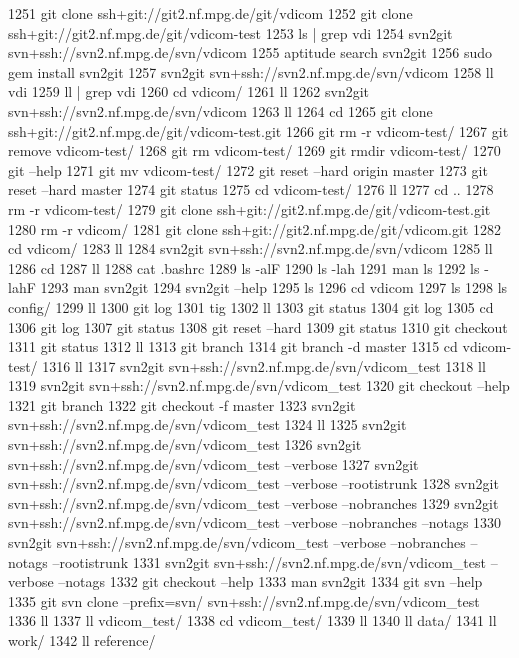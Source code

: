  1251  git clone ssh+git://git2.nf.mpg.de/git/vdicom
 1252  git clone ssh+git://git2.nf.mpg.de/git/vdicom-test
 1253  ls | grep vdi
 1254  svn2git svn+ssh://svn2.nf.mpg.de/svn/vdicom
 1255  aptitude search svn2git
 1256  sudo gem install svn2git
 1257  svn2git svn+ssh://svn2.nf.mpg.de/svn/vdicom
 1258  ll vdi
 1259  ll | grep vdi 
 1260  cd vdicom/
 1261  ll
 1262  svn2git svn+ssh://svn2.nf.mpg.de/svn/vdicom
 1263  ll
 1264  cd
 1265  git clone ssh+git://git2.nf.mpg.de/git/vdicom-test.git
 1266  git rm -r vdicom-test/
 1267  git remove vdicom-test/
 1268  git rm vdicom-test/
 1269  git rmdir vdicom-test/
 1270  git --help
 1271  git mv vdicom-test/
 1272  git reset --hard origin master
 1273  git reset --hard master
 1274  git status
 1275  cd vdicom-test/
 1276  ll
 1277  cd ..
 1278  rm -r vdicom-test/
 1279  git clone ssh+git://git2.nf.mpg.de/git/vdicom-test.git
 1280  rm -r vdicom/
 1281  git clone ssh+git://git2.nf.mpg.de/git/vdicom.git
 1282  cd vdicom/
 1283  ll
 1284  svn2git svn+ssh://svn2.nf.mpg.de/svn/vdicom
 1285  ll
 1286  cd
 1287  ll
 1288  cat .bashrc
 1289  ls -alF
 1290  ls -lah
 1291  man ls
 1292  ls -lahF
 1293  man svn2git
 1294  svn2git --help
 1295  ls
 1296  cd vdicom
 1297  ls
 1298  ls config/
 1299  ll
 1300  git log
 1301  tig
 1302  ll
 1303  git status
 1304  git log
 1305  cd
 1306  git log
 1307  git status
 1308  git reset --hard
 1309  git status
 1310  git checkout
 1311  git status
 1312  ll
 1313  git branch
 1314  git branch -d master
 1315  cd vdicom-test/
 1316  ll
 1317  svn2git svn+ssh://svn2.nf.mpg.de/svn/vdicom_test
 1318  ll
 1319  svn2git svn+ssh://svn2.nf.mpg.de/svn/vdicom_test
 1320  git checkout --help
 1321  git branch
 1322  git checkout -f master
 1323  svn2git svn+ssh://svn2.nf.mpg.de/svn/vdicom_test
 1324  ll
 1325  svn2git svn+ssh://svn2.nf.mpg.de/svn/vdicom_test
 1326  svn2git svn+ssh://svn2.nf.mpg.de/svn/vdicom_test --verbose
 1327  svn2git svn+ssh://svn2.nf.mpg.de/svn/vdicom_test --verbose --rootistrunk
 1328  svn2git svn+ssh://svn2.nf.mpg.de/svn/vdicom_test --verbose --nobranches
 1329  svn2git svn+ssh://svn2.nf.mpg.de/svn/vdicom_test --verbose --nobranches --notags
 1330  svn2git svn+ssh://svn2.nf.mpg.de/svn/vdicom_test --verbose --nobranches --notags --rootistrunk
 1331  svn2git svn+ssh://svn2.nf.mpg.de/svn/vdicom_test --verbose --notags
 1332  git checkout --help
 1333  man svn2git
 1334  git svn --help
 1335  git svn clone --prefix=svn/ svn+ssh://svn2.nf.mpg.de/svn/vdicom_test
 1336  ll
 1337  ll vdicom_test/
 1338  cd vdicom_test/
 1339  ll
 1340  ll data/
 1341  ll work/
 1342  ll reference/
